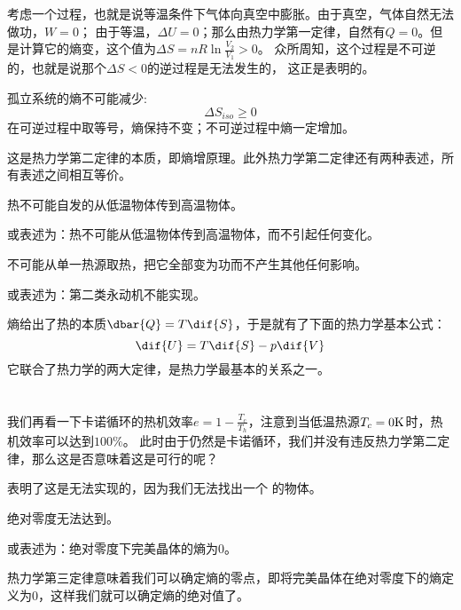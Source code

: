             考虑一个过程，也就是说等温条件下气体向真空中膨胀。由于真空，气体自然无法做功，$W=0$；
            由于等温，$\Delta U=0$；那么由热力学第一定律，自然有$Q=0$。但是计算它的熵变，这个值为$\Delta S = nR\ln\frac{V_2}{V_1}>0$。
            众所周知，这个过程是不可逆的，也就是说那个$\Delta S<0$的逆过程是无法发生的，
            这正是表明的。
            \begin{law}
                孤立系统的熵不可能减少:
                \begin{equation}
                    \Delta S_{iso} \geq 0
                    \nonumber
                \end{equation}
                在可逆过程中取等号，熵保持不变；不可逆过程中熵一定增加。
            \end{law}
            这是热力学第二定律的本质，即熵增原理。此外热力学第二定律还有两种表述，所有表述之间相互等价。
            \begin{law}
                热不可能自发的从低温物体传到高温物体。

                或表述为：热不可能从低温物体传到高温物体，而不引起任何变化。
            \end{law}
            \begin{law}
                不可能从单一热源取热，把它全部变为功而不产生其他任何影响。

                或表述为：第二类永动机不能实现。
            \end{law}
            熵给出了热的本质$\dbar{Q} = T\dif{S}$，于是就有了下面的热力学基本公式：
            \begin{equation}
                \dif{U} = T\dif{S}-p\dif{V}
                \nonumber
            \end{equation}
            它联合了热力学的两大定律，是热力学最基本的关系之一。
    \section[热力学第三定律]{}
        我们再看一下卡诺循环的热机效率$e = 1-\frac{T_c}{T_h}$，注意到当低温热源$T_c = 0 \rm{K}$时，热机效率可以达到$100\%$。
        此时由于仍然是卡诺循环，我们并没有违反热力学第二定律，那么这是否意味着这是可行的呢？

        表明了这是无法实现的，因为我们无法找出一个\linebreak{}
        的物体。
        \begin{law}
            绝对零度无法达到。

            或表述为：绝对零度下完美晶体的熵为$0$。
        \end{law}
        热力学第三定律意味着我们可以确定熵的零点，即将完美晶体在绝对零度下的熵定义为$0$，这样我们就可以确定熵的绝对值了。
